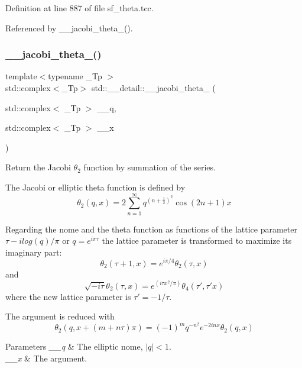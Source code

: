 Definition at line 887 of file sf\+\_\+theta.\+tcc.



Referenced by \+\_\+\+\_\+jacobi\+\_\+theta\+\_().

\mbox{\label{namespacestd_1_1____detail_aba908b579191a0c5f55be7db84ece5c5}} 
\subsubsection{\texorpdfstring{\+\_\+\+\_\+jacobi\+\_\+theta\+\_()}{\_\_jacobi\_theta\_2()}\hspace{0.1cm}{\footnotesize\ttfamily [1/2]}}
{\footnotesize\ttfamily template$<$typename \+\_\+\+Tp $>$ \\
std\+::complex$<$\+\_\+\+Tp$>$ std\+::\+\_\+\+\_\+detail\+::\+\_\+\+\_\+jacobi\+\_\+theta\+\_ (\begin{DoxyParamCaption}\item[{std\+::complex$<$ \+\_\+\+Tp $>$}]{\+\_\+\+\_\+q,  }\item[{std\+::complex$<$ \+\_\+\+Tp $>$}]{\+\_\+\+\_\+x }\end{DoxyParamCaption})}

Return the Jacobi $ \theta_2 $ function by summation of the series.

The Jacobi or elliptic theta function is defined by \[ \theta_2(q,x) = 2\sum_{n=1}^{\infty} q^{(n+\frac{1}{2})^2}\cos{(2n+1)x} \]

Regarding the nome and the theta function as functions of the lattice parameter $ \tau -i log(q)/ \pi $ or $ q = e^{i\pi\tau} $ the lattice parameter is transformed to maximize its imaginary part\+: \[ \theta_2(\tau+1,x) = e^{i\pi/4}\theta_2(\tau,x) \] and \[ \sqrt{-i\tau}\theta_2(\tau,x) = e^{(i\tau x^2/\pi)}\theta_4(\tau',\tau' x) \] where the new lattice parameter is $ \tau' = -1/\tau $.

The argument is reduced with \[ \theta_2(q, x + (m+n\tau)\pi) = (-1)^{m}q^{-n^2}e^{-2inx}\theta_2(q, x) \]


\begin{DoxyParams}{Parameters}
{\em \+\_\+\+\_\+q} & The elliptic nome, $ |q| < 1 $. \\
\hline
{\em \+\_\+\+\_\+x} & The argument. \\
\hline
\end{DoxyParams}


